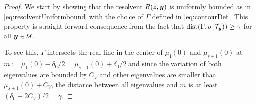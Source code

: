 \begin{proof}



%
We start by showing that the resolvent $R(z,{\boldsymbol{y}})$ is uniformly bounded as in \eqref{eq:resolventUniformbound} with the choice of $\Gamma$ defined in  \eqref{eq:contourDef}. This property is straight forward consequence from the fact that $\mathrm{dist}(\Gamma, \sigma(\mathcal{T}_{\boldsymbol{y}})) \geq \gamma$ for all ${\boldsymbol{y}} \in \mathcal{U}$.

To see this, $\Gamma$ intersects the real line in the center of $\mu_1(0)$ and $\mu_{s+1}(0)$ at $m := \mu_1(0) - \delta_0/2  = \mu_{s+1}(0) +  \delta_0/2 $ and since the variation of both eigenvalues are bounded by $C_V$ and other eigenvalues are smaller than $\mu_{s+1}(0) + C_V$, the distance between all eigenvalues and $m$ is at least $(\delta_0 -2C_V)/2 = \gamma$. 


\end{proof}
